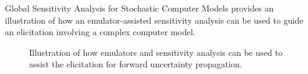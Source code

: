 \begin{chapter}{Global Sensitivity Analysis for Stochastic Computer Models}
 provides an illustration of how an emulator-assisted sensitivity analysis can be used to guide an elicitation involving a complex computer model.
\begin{figure}

\caption{Illustration of how emulators and sensitivity analysis can be used to assist the elicitation for forward uncertainty propagation.}
\label{Fig:elicitation-flowchart}
\end{figure}
\end{chapter}
